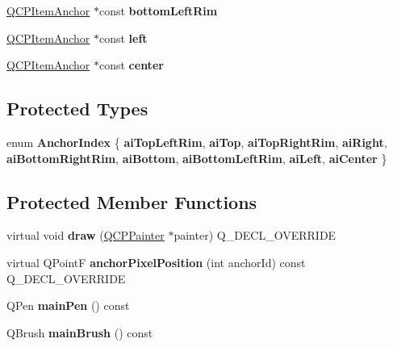 \begin{DoxyCompactItemize}
\mbox{\label{class_q_c_p_item_ellipse_a31f31a9e9f9098c90fb47573094276c5}} 
\hyperlink{class_q_c_p_item_anchor}{Q\+C\+P\+Item\+Anchor} $\ast$const {\bfseries bottom\+Left\+Rim}
\item 
\mbox{\label{class_q_c_p_item_ellipse_aa259cd03efaedf60cf5b1019b20e4f2b}} 
\hyperlink{class_q_c_p_item_anchor}{Q\+C\+P\+Item\+Anchor} $\ast$const {\bfseries left}
\item 
\mbox{\label{class_q_c_p_item_ellipse_a8b6dd0e854f99239c5806ffdf2f590b3}} 
\hyperlink{class_q_c_p_item_anchor}{Q\+C\+P\+Item\+Anchor} $\ast$const {\bfseries center}
\end{DoxyCompactItemize}
\subsection*{Protected Types}
\begin{DoxyCompactItemize}
\item 
\mbox{\label{class_q_c_p_item_ellipse_a415009889543169f35b70795f415e45e}} 
enum {\bfseries Anchor\+Index} \{ \newline
{\bfseries ai\+Top\+Left\+Rim}, 
{\bfseries ai\+Top}, 
{\bfseries ai\+Top\+Right\+Rim}, 
{\bfseries ai\+Right}, 
\newline
{\bfseries ai\+Bottom\+Right\+Rim}, 
{\bfseries ai\+Bottom}, 
{\bfseries ai\+Bottom\+Left\+Rim}, 
{\bfseries ai\+Left}, 
\newline
{\bfseries ai\+Center}
 \}
\end{DoxyCompactItemize}
\subsection*{Protected Member Functions}
\begin{DoxyCompactItemize}
\item 
\mbox{\label{class_q_c_p_item_ellipse_a77eebd67a402fc496082a2e51356928c}} 
virtual void {\bfseries draw} (\hyperlink{class_q_c_p_painter}{Q\+C\+P\+Painter} $\ast$painter) Q\+\_\+\+D\+E\+C\+L\+\_\+\+O\+V\+E\+R\+R\+I\+DE
\item 
\mbox{\label{class_q_c_p_item_ellipse_a35cd6983c61a16ac33c23f08dd2817cc}} 
virtual Q\+PointF {\bfseries anchor\+Pixel\+Position} (int anchor\+Id) const Q\+\_\+\+D\+E\+C\+L\+\_\+\+O\+V\+E\+R\+R\+I\+DE
\item 
\mbox{\label{class_q_c_p_item_ellipse_a9c11717026dfd685c83a9650666b7181}} 
Q\+Pen {\bfseries main\+Pen} () const
\item 
\mbox{\label{class_q_c_p_item_ellipse_a6218bdf5e703f609b934b0bf9c8d0971}} 
Q\+Brush {\bfseries main\+Brush} () const
\end{DoxyCompactItemize}
